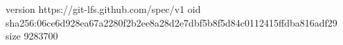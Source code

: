 version https://git-lfs.github.com/spec/v1
oid sha256:06ce6d928ea67a2280f2b2ee8a28d2e7dbf5b8f5d84c0112415ffdba816adf29
size 9283700
